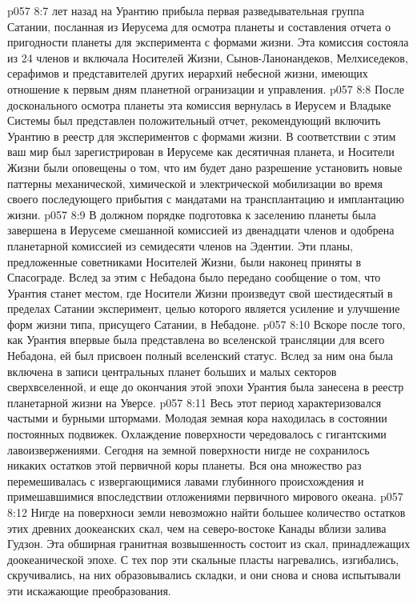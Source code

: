 \vs p057 8:7 \pc {} лет назад на Урантию прибыла первая разведывательная группа Сатании, посланная из Иерусема для осмотра планеты и составления отчета о пригодности планеты для эксперимента с формами жизни. Эта комиссия состояла из 24 членов и включала Носителей Жизни, Сынов\hyp{}Ланонандеков, Мелхиседеков, серафимов и представителей других иерархий небесной жизни, имеющих отношение к первым дням планетной огранизации и управления.
\vs p057 8:8 После досконального осмотра планеты эта комиссия вернулась в Иерусем и Владыке Системы был представлен положительный отчет, рекомендующий включить Урантию в реестр для экспериментов с формами жизни. В соответствии с этим ваш мир был зарегистрирован в Иерусеме как десятичная планета, и Носители Жизни были оповещены о том, что им будет дано разрешение установить новые паттерны механической, химической и электрической мобилизации во время своего последующего прибытия с мандатами на трансплантацию и имплантацию жизни.
\vs p057 8:9 В должном порядке подготовка к заселению планеты была завершена в Иерусеме смешанной комиссией из двенадцати членов и одобрена планетарной комиссией из семидесяти членов на Эдентии. Эти планы, предложенные советниками Носителей Жизни, были наконец приняты в Спасограде. Вслед за этим с Небадона было передано сообщение о том, что Урантия станет местом, где Носители Жизни произведут свой шестидесятый в пределах Сатании эксперимент, целью которого является усиление и улучшение форм жизни типа, присущего Сатании, в Небадоне.
\vs p057 8:10 Вскоре после того, как Урантия впервые была представлена во вселенской трансляции для всего Небадона, ей был присвоен полный вселенский статус. Вслед за ним она была включена в записи центральных планет больших и малых секторов сверхвселенной, и еще до окончания этой эпохи Урантия была занесена в реестр планетарной жизни на Уверсе.
\vs p057 8:11 \pc Весь этот период характеризовался частыми и бурными штормами. Молодая земная кора находилась в состоянии постоянных подвижек. Охлаждение поверхности чередовалось с гигантскими лавоизвержениями. Сегодня на земной поверхности нигде не сохранилось никаких остатков этой первичной коры планеты. Вся она множество раз перемешивалась с извергающимися лавами глубинного происхождения и примешавшимися впоследствии отложениями первичного мирового океана.
\vs p057 8:12 Нигде на поверхноси земли невозможно найти большее количество остатков этих древних доокеанских скал, чем на северо\hyp{}востоке Канады вблизи залива Гудзон. Эта обширная гранитная возвышенность состоит из скал, принадлежащих доокеанической эпохе. С тех пор эти скальные пласты нагревались, изгибались, скручивались, на них образовывались складки, и они снова и снова испытывали эти искажающие преобразования.
